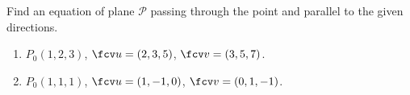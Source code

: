 Find an equation of plane $\mathcal P$ passing through the point and parallel to the given directions.

\begin{enumerate}
\item $P_0(1,2,3)$, $\fcv u=(2,3,5)$, $\fcv v=(3,5,7 )$.

\item $P_0(1,1,1)$, $\fcv u=(1,-1,0)$, $\fcv v= (0,1,-1)$.
\end{enumerate}
